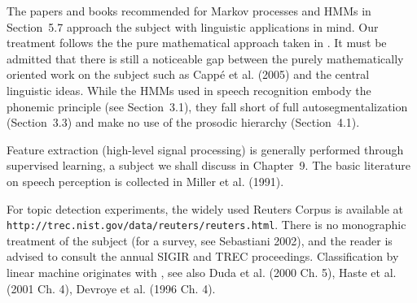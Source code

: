 The papers and books recommended for Markov processes and HMMs in Section~5.7
approach the subject with linguistic applications in mind. Our treatment
follows the the pure mathematical approach taken in .
It must be admitted that there is still a noticeable gap between the purely
mathematically oriented work on the subject such as Capp\'e et al.
(2005)\nocite{Cappe:2005} and the central linguistic ideas. While the HMMs
used in speech recognition embody the phonemic principle (see Section~3.1),
they fall short of full autosegmentalization (Section~3.3) and make no use of
the prosodic hierarchy (Section~4.1).

Feature extraction (high-level signal processing) is generally performed
through supervised learning, a subject we shall discuss in Chapter~9.  The
basic literature on speech perception is collected in Miller et al. (1991).
\nocite{Miller:1991}

For topic detection experiments, the widely used Reuters Corpus is available
at {\tt http://trec.nist.gov/data/reuters/reuters.html}. There is no
monographic treatment of the subject (for a survey, see Sebastiani
2002),\nocite{Sebastiani:2002} and the reader is advised to consult the annual
SIGIR and TREC proceedings.  Classification by linear machine originates with
, see also Duda et al. (2000 Ch. 5), Haste et
al. (2001 Ch. 4), Devroye et al. (1996 Ch. 4).

\endinput


